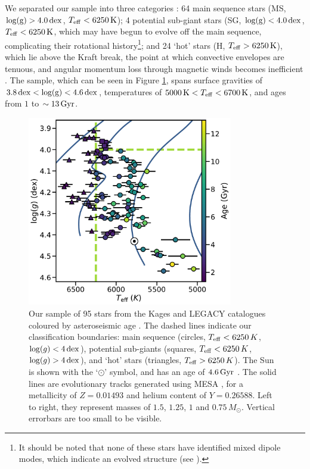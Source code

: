 \documentclass[12pt]{article}
\newcommand{\teff}{\mbox{$T_{\rm eff}$}\xspace}
\newcommand{\logg}{\mbox{$\log(g)$}\xspace}
\begin{document}
We separated our sample into three categories \cite{garcia+2014}: 64 main sequence stars (MS, $\rm{log(g)} > 4.0\, \rm dex$, $T_{\rm eff} < 6250\, \rm K$); 4 potential sub-giant stars (SG, $\rm{log(g)} < 4.0\, \rm dex$, $T_{\rm eff} < 6250\, \rm K$, which may have begun to evolve off the main sequence, complicating their rotational history\footnote{It should be noted that none of these stars have identified mixed dipole modes, which indicate an evolved structure (see \cite{bedding+2010}).}; and 24 `hot' stars (H, $T_{\rm eff} > 6250\, \rm K$), which lie above the Kraft break, the point at which convective envelopes are tenuous, and angular momentum loss through magnetic winds becomes inefficient \cite{kraft1967}. The sample, which can be seen in Figure \ref{fig:sample}, spans surface gravities of $3.8\, \rm{dex} < \rm{log(g)} < 4.6\, \rm{dex}$, temperatures of $5000\, \textrm{K} < T_{\rm eff} <  6700\, \rm{K}$, and ages from $1$ to $\sim 13\, \rm{Gyr}$.\\

\begin{figure}
	\centering
	\includegraphics[width=0.8\textwidth]{data.pdf}
	\caption{Our sample of 95 stars from the Kages and LEGACY catalogues coloured by asteroseismic age  \cite{silvaaguirre+2015, silvaaguirre+2017}. The dashed lines indicate our classification boundaries: main sequence (circles, $\teff < 6250\, K$, $\logg < 4\, \rm{dex}$), potential sub-giants (squares, $\teff < 6250\, K$, $\logg > 4\, \rm{dex}$), and `hot' stars (triangles, $\teff > 6250\, K$). The Sun is shown with the `$\odot$' symbol, and has an age of $4.6\, \rm{Gyr}$ \cite{bonanno+frohlich2015
		}. The solid lines are evolutionary tracks generated using MESA \cite{paxton+2017}, for a metallicity of $Z = 0.01493$ and helium content of $Y = 0.26588$. Left to right, they represent masses of $1.5$, $1.25$, $1$ and $0.75\, M_\odot$. Vertical errorbars are too small to be visible.}
	\label{fig:sample}
\end{figure}
\end{document}
